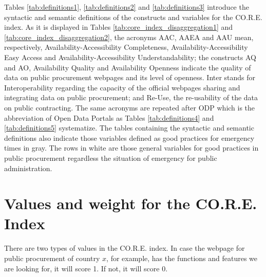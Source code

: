 \documentclass[a4paper, twoside]{report}
\begin{document}
Tables \ref{tab:definitions1}, \ref{tab:definitions2} and \ref{tab:definitions3} introduce the syntactic and semantic definitions of the constructs and variables for the CO.R.E. index. As it is displayed in Tables \ref{tab:core_index_disaggregation1} and \ref{tab:core_index_disaggregation2}, the acronyms AAC, AAEA and AAU mean, respectively, Availability-Accessibility Completeness, Availability-Accessibility Easy Access and Availability-Accessibility Understandability; the constructs AQ and AO, Availability Quality and Availability Openness indicate the quality of data on public procurement webpages and its level of openness. Inter stands for Interoperability regarding the capacity of the official webpages sharing and integrating data on public procurement; and Re-Use, the re-usability of the data on public contracting. The same acronyms are repeated after ODP which is the abbreviation of Open Data Portals as Tables \ref{tab:definitions4} and  \ref{tab:definitions5} systematize. The tables containing the syntactic and semantic definitions also indicate those variables defined as good practices for emergency times in gray. The rows in white are those general variables for good practices in public procurement regardless the situation of emergency for public administration.\\

\section{Values and weight for the CO.R.E. Index}
\label{subchapter_values_weight}

There are two types of values in the CO.R.E. index. In case the webpage for public procurement of country $x$, for example, has the functions and features we are looking for, it will score 1. If not, it will score 0.
\end{document}
